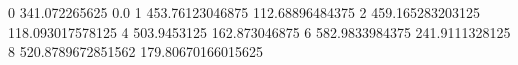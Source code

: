0 341.072265625 0.0
1 453.76123046875 112.68896484375
2 459.165283203125 118.093017578125
4 503.9453125 162.873046875
6 582.9833984375 241.9111328125
8 520.8789672851562 179.80670166015625
